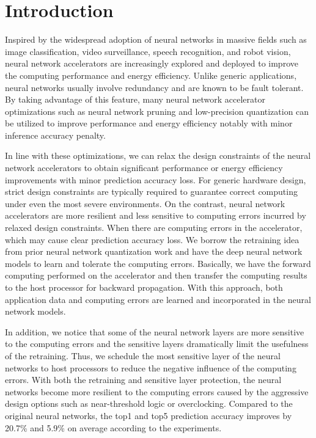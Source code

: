\section{Introduction} \label{sec:intro}
Inspired by the widespread adoption of neural networks in massive fields such as image classification, 
video surveillance, speech recognition, and robot vision, neural network accelerators 
\cite{deepburing_12,DiCecco_4} 
are increasingly explored and deployed to improve the computing performance and energy efficiency.
Unlike generic applications, neural networks usually involve redundancy and are known to be 
fault tolerant\cite{Reagen2016}. By taking advantage of this feature, many neural network accelerator optimizations 
such as neural network pruning and low-precision quantization can be utilized to improve 
performance and energy efficiency notably with minor inference accuracy penalty\cite{Han2016DeepCC}. 

In line with these optimizations, we can relax the design constraints of 
the neural network accelerators to obtain significant performance or energy efficiency 
improvements with minor prediction accuracy loss. 
For generic hardware design, strict design constraints are typically required to 
guarantee correct computing under even the most severe environments. On the contrast, 
neural network accelerators are more resilient and less sensitive to computing 
errors incurred by relaxed design constraints. When there are computing errors in the accelerator, 
which may cause clear prediction accuracy loss. We borrow the retraining 
idea from prior neural network quantization work \cite{Hwang2014_17} 
and have the deep neural network models to learn and tolerate the computing errors.  
Basically, we have the forward computing performed on the accelerator and 
then transfer the computing results to the host processor for 
backward propagation. With this approach, both application data and computing 
errors are learned and incorporated in the neural network models.  

In addition, we notice that some of the neural network layers are more sensitive to the 
computing errors and the sensitive layers dramatically limit the usefulness of the retraining. 
Thus, we schedule the most sensitive layer of the neural networks to host processors to reduce the negative influence 
of the computing errors. With both the retraining and sensitive layer protection, 
the neural networks become more resilient to the computing errors caused by 
the aggressive design options such as near-threshold logic or overclocking.
Compared to the original neural networks, the top1 and top5 prediction accuracy
improves by 20.7\% and 5.9\% on average according to the experiments. 

